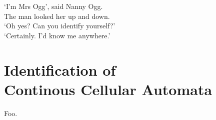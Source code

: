 
\begin{savequote}[99mm]
‘I’m Mrs Ogg’, said Nanny Ogg.\\
The man looked her up and down.\\
‘Oh yes? Can you identify yourself?’\\
‘Certainly. I’d know me anywhere.'\\
\end{savequote}


\chapter[Identification of Continous Cellular Automata]{Identification of\\Continous Cellular Automata}

Foo.
